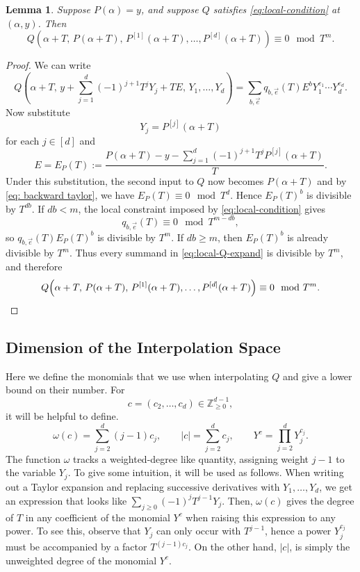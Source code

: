 \documentclass[11pt]{article}
\newtheorem{lemma}[theorem]{Lemma}
\begin{document}
\begin{lemma}\label{lem:contact}
Suppose \(P(\alpha)=y\), and suppose \(Q\) satisfies
\eqref{eq:local-condition} at \((\alpha,y)\).  Then
\[
Q\!\left(
\alpha+T,\,
P(\alpha+T),\,
P^{[1]}(\alpha+T),\ldots,P^{[d]}(\alpha+T)
\right)
\equiv0\mod{T^m}.
\]
\end{lemma}
\begin{proof}
We can write
\[
Q\!\left(
\alpha+T,\,
y+\sum_{j=1}^d(-1)^{j+1}T^jY_j+TE,\,
Y_1,\ldots,Y_d
\right)
=
\sum_{b,\vec{e}}q_{b,\vec{e}}(T)E^bY_1^{e_1}\cdots Y_d^{e_d}.
\]
Now substitute
\[
Y_j=P^{[j]}(\alpha+T)
\]
for each $j \in [d]$ and
\begin{equation} \label{eq: tmp expansion}
E=E_P(T):=
\frac{
P(\alpha+T)-y-\sum_{j=1}^d(-1)^{j+1}T^jP^{[j]}(\alpha+T)
}{T}.
\end{equation}
Under this substitution, the second input to $Q$ now becomes $P(\alpha+T)$ and by \eqref{eq: backward taylor}, we have $E_P(T)\equiv0\mod{T^d}.$
Hence $E_P(T)^b$ is divisible by $T^{db}$.  If $db<m$, the local
constraint imposed by \eqref{eq:local-condition} gives
\[
q_{b,\vec{e}}(T)\equiv0\mod{T^{m-db}},
\]
so $q_{b,\vec{e}}(T)E_P(T)^b$ is divisible by $T^m$.  If $db\ge m$,
then $E_P(T)^b$ is already divisible by $T^m$.  Thus every summand in \eqref{eq:local-Q-expand} is 
divisible by $T^m$, and therefore
\[
Q\!\left(
\alpha+T,\,
P(\alpha+T),\,
P^{[1]}(\alpha+T),\ldots,P^{[d]}(\alpha+T)
\right)
\equiv0\mod{T^m}.\qedhere
\]
\end{proof}

\subsection{Dimension of the Interpolation Space}

Here we define the monomials that we use when interpolating $Q$ and give
a lower bound on their number. For
\[
c=(c_2,\ldots,c_{d})
\in\mathbb Z_{\ge0}^{d-1},
\]
it will be helpful to define.
\[
\omega(c)
=
\sum_{j=2}^{d}(j-1)c_j,
\qquad
|c|
=
\sum_{j=2}^{d}c_j,
\qquad
Y^c
=
\prod_{j=2}^{d}Y_j^{c_j}.
\]
The function $\omega$ tracks a weighted-degree like quantity, assigning weight $j-1$ to the variable $Y_j$. To give some intuition, it will be used as follows. When writing out a Taylor expansion and replacing successive derivatives with $Y_1, \ldots, Y_d$, we get an expression that looks like $\sum_{j \geq 0} (-1)^{j} T^{j-1} Y_j$. Then, $\omega(c)$ gives the degree of $T$ in any coefficient of the monomial $Y^c$ when raising this expression to any power. To see this, observe that $Y_j$ can only occur with $T^{j-1}$, hence a power $Y_j^{c_j}$ must be accompanied by a factor $T^{(j-1)c_j}$. On the other hand, $|c|$, is simply the unweighted degree of the monomial $Y^c$. 
\end{document}
